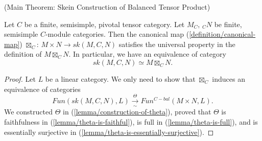 \begin{theorem} (Main Theorem: Skein Construction of Balanced Tensor Product) \label{theorem/main-theorem}

  \noindent Let $C$ be a finite, semisimple, pivotal tensor category. Let
  $M_{C}, \, {}_{C}N$ be finite, semisimple $C$-module categories. Then the
  canonical map (\ref{definition/canonical-map}) $\boxtimes_{C}$:
  $M \times N \to sk(M,C,N)$ satisfies the universal property in the
  definition of $M \boxtimes_{C} N$. In particular, we have an equivalence of
  category
  \[
    sk(M,C,N) \simeq M \boxtimes_{C} N.
  \]
\end{theorem}

\begin{proof}
  Let $L$ be a linear category. We only need to show that $\boxtimes_{C}$
  induces an equivalence of categories
  \[
    Fun(sk(M,C,N), L) \xrightarrow[\sim]{\Theta} Fun^{C-bal}(M \times N, L).
  \]
  We constructed $\Theta$ in (\ref{lemma/construction-of-theta}), proved that
  $\Theta$ is faithfulness in (\ref{lemma/theta-is-faithful}), is full in
  (\ref{lemma/theta-is-full}), and is essentially surjective in
  (\ref{lemma/theta-is-essentially-surjective}).
\end{proof}
